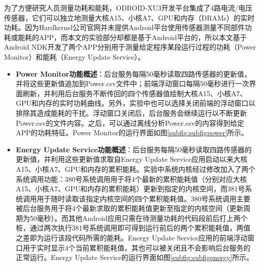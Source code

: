 为了方便研究人员测量功耗和能耗，ODROID-XU3开发平台集成了4路电流/电压传感器，它们可以独立地测量大核A15、小核A7、GPU和内存（DRAMs）的实时功耗。因为Hardkernel公司官网并未提供Android平台使用传感器测量不同部件功耗或能耗的APP，而本文的实验部分却都是基于Android平台的，所以本文基于Android NDK开发了两个APP分别用于测量给定程序某段运行过程的功耗（Power Monitor）和能耗（Energy Update Service）。
\begin{itemize}
  \item \textbf{Power Monitor功能概述}：后台服务每隔50毫秒读取四路传感器的更新值，并将这些更新值追加到Power.csv文件中；前端浮动窗口每隔50毫秒进行一次界面刷新，并利用后台服务不断传回的四个传感器值绘制大核A15、小核A7、GPU和内存的实时功耗曲线。另外，实验中也可以选择关闭前端的浮动窗口以排除其造成能耗的干扰。浮动窗口关闭后，后台服务会继续运行以不断更新Power.csv的文件内容。之后，可以通过离线分析Power.csv的内容得到给定APP的功耗特征。Power Monitor的运行界面如图\ref{subfig:subfigpower}所示。
  \item \textbf{Energy Update Service功能概述}：后台服务每隔50毫秒读取四路传感器的更新值，并利用这些更新值求取自Energy Update Service应用启动以来大核A15、小核A7、GPU和内存的累积能耗。实验中系统内核经过修改加入了两个系统调用功能：380号系统调用用于将4个最新的累积能耗值（分别对应大核A15、小核A7、GPU和内存的累积能耗）更新到指定的内核空间，而381号系统调用用于随时读取该指定内核空间的四个累积能耗值。380号系统调用主要被后台服务用于将4个最新求取的累积能耗值更新至指定的内核空间（更新周期为50毫秒）。而其他Android应用只需在待测量功耗的代码段前后打上两个桩，通过两次执行381号系统调用即可得到运行前后的两个累积能耗值，两值之差即为运行该段代码所需的能耗。Energy Update Service应用的前端浮动窗口用于实时显示4个当前累积能耗值，其也可以被关闭且不会影响后台服务的正常运行。Energy Update Service的运行界面如图\ref{subfig:subfigenergy}所示。
\end{itemize}

